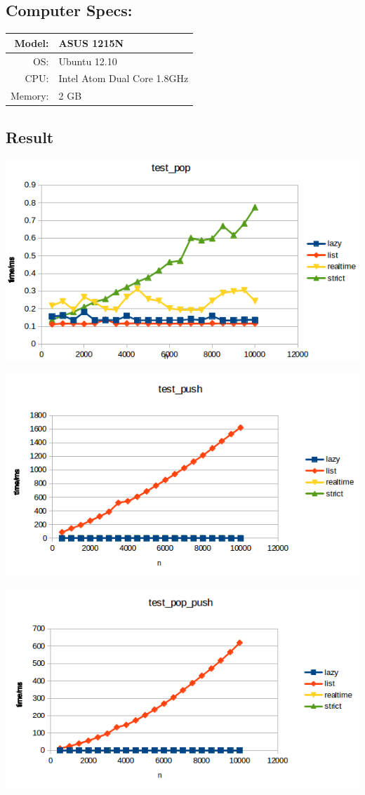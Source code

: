 \subsection{Computer Specs:}
\begin{tabular}{| r  l |} \hline
Model: &  ASUS 1215N \\ \hline
OS: & Ubuntu 12.10 \\ \hline
CPU: & Intel Atom Dual Core 1.8GHz\\ \hline
Memory: & 2 GB\\ \hline
\end{tabular}

\subsection{Result}
\includegraphics{Graphs/test_pop.png}


\includegraphics{Graphs/test_push.png}


\includegraphics{Graphs/test_pop_push.png}


